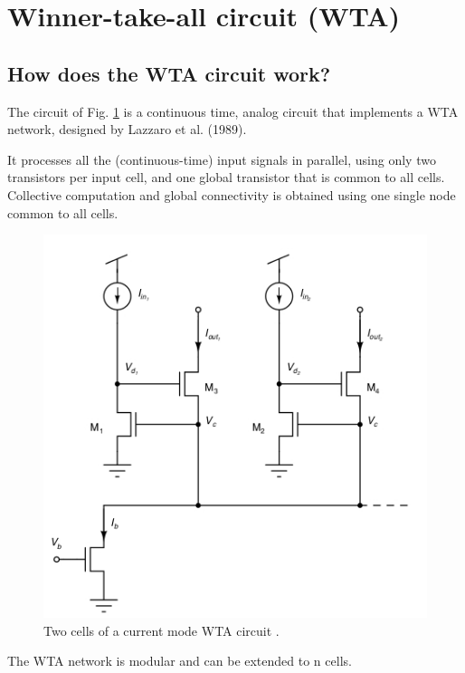 \documentclass[main]{subfiles}
\begin{document}


\section{Winner-take-all circuit (WTA)}
\subsection{How does the WTA circuit work?}

The circuit of Fig. \ref{fig:WTA} is a continuous time, analog circuit that implements
a WTA network, designed by Lazzaro et al. (1989).

It processes all the (continuous-time) input signals in
parallel, using only two transistors per input cell, and one global transistor
that is common to all cells. Collective computation and global connectivity is
obtained using one single node common to all cells.

\begin{figure}[htbp]
  \centering
  \includegraphics[scale=0.8]{figs/WTA.jpg}
  \caption{Two cells of a current mode WTA circuit \cite{book:VLSI}.}
  \label{fig:WTA}
\end{figure} 

The WTA network is modular and can be extended to n cells. 
\end{document}
